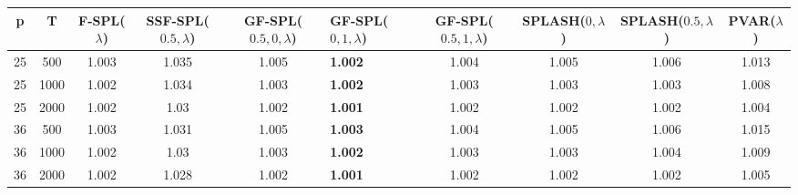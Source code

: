 \begin{tabular}{ccccclcccc}
\hline
  p  &  T   &  F-SPL($\lambda$)  &  SSF-SPL($0.5, \lambda$)  &  GF-SPL($0.5, 0, \lambda$)  & GF-SPL($0, 1, \lambda$)   &  GF-SPL($0.5, 1, \lambda$)  &  SPLASH($0, \lambda$)  &  SPLASH($0.5, \lambda$)  &  PVAR($\lambda$)  \\
\hline
 25  & 500  &       1.003        &           1.035           &            1.005            & \textbf{1.002}            &            1.004            &         1.005          &          1.006           &       1.013       \\
 25  & 1000 &       1.002        &           1.034           &            1.003            & \textbf{1.002}            &            1.003            &         1.003          &          1.003           &       1.008       \\
 25  & 2000 &       1.002        &           1.03            &            1.002            & \textbf{1.001}            &            1.002            &         1.002          &          1.002           &       1.004       \\
 36  & 500  &       1.003        &           1.031           &            1.005            & \textbf{1.003}            &            1.004            &         1.005          &          1.006           &       1.015       \\
 36  & 1000 &       1.002        &           1.03            &            1.003            & \textbf{1.002}            &            1.003            &         1.003          &          1.004           &       1.009       \\
 36  & 2000 &       1.002        &           1.028           &            1.002            & \textbf{1.001}            &            1.002            &         1.002          &          1.002           &       1.005       \\
\hline
\end{tabular}